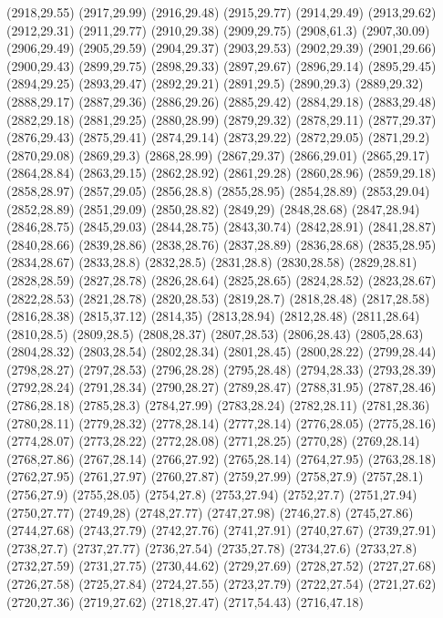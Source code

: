 (2918,29.55)
(2917,29.99)
(2916,29.48)
(2915,29.77)
(2914,29.49)
(2913,29.62)
(2912,29.31)
(2911,29.77)
(2910,29.38)
(2909,29.75)
(2908,61.3)
(2907,30.09)
(2906,29.49)
(2905,29.59)
(2904,29.37)
(2903,29.53)
(2902,29.39)
(2901,29.66)
(2900,29.43)
(2899,29.75)
(2898,29.33)
(2897,29.67)
(2896,29.14)
(2895,29.45)
(2894,29.25)
(2893,29.47)
(2892,29.21)
(2891,29.5)
(2890,29.3)
(2889,29.32)
(2888,29.17)
(2887,29.36)
(2886,29.26)
(2885,29.42)
(2884,29.18)
(2883,29.48)
(2882,29.18)
(2881,29.25)
(2880,28.99)
(2879,29.32)
(2878,29.11)
(2877,29.37)
(2876,29.43)
(2875,29.41)
(2874,29.14)
(2873,29.22)
(2872,29.05)
(2871,29.2)
(2870,29.08)
(2869,29.3)
(2868,28.99)
(2867,29.37)
(2866,29.01)
(2865,29.17)
(2864,28.84)
(2863,29.15)
(2862,28.92)
(2861,29.28)
(2860,28.96)
(2859,29.18)
(2858,28.97)
(2857,29.05)
(2856,28.8)
(2855,28.95)
(2854,28.89)
(2853,29.04)
(2852,28.89)
(2851,29.09)
(2850,28.82)
(2849,29)
(2848,28.68)
(2847,28.94)
(2846,28.75)
(2845,29.03)
(2844,28.75)
(2843,30.74)
(2842,28.91)
(2841,28.87)
(2840,28.66)
(2839,28.86)
(2838,28.76)
(2837,28.89)
(2836,28.68)
(2835,28.95)
(2834,28.67)
(2833,28.8)
(2832,28.5)
(2831,28.8)
(2830,28.58)
(2829,28.81)
(2828,28.59)
(2827,28.78)
(2826,28.64)
(2825,28.65)
(2824,28.52)
(2823,28.67)
(2822,28.53)
(2821,28.78)
(2820,28.53)
(2819,28.7)
(2818,28.48)
(2817,28.58)
(2816,28.38)
(2815,37.12)
(2814,35)
(2813,28.94)
(2812,28.48)
(2811,28.64)
(2810,28.5)
(2809,28.5)
(2808,28.37)
(2807,28.53)
(2806,28.43)
(2805,28.63)
(2804,28.32)
(2803,28.54)
(2802,28.34)
(2801,28.45)
(2800,28.22)
(2799,28.44)
(2798,28.27)
(2797,28.53)
(2796,28.28)
(2795,28.48)
(2794,28.33)
(2793,28.39)
(2792,28.24)
(2791,28.34)
(2790,28.27)
(2789,28.47)
(2788,31.95)
(2787,28.46)
(2786,28.18)
(2785,28.3)
(2784,27.99)
(2783,28.24)
(2782,28.11)
(2781,28.36)
(2780,28.11)
(2779,28.32)
(2778,28.14)
(2777,28.14)
(2776,28.05)
(2775,28.16)
(2774,28.07)
(2773,28.22)
(2772,28.08)
(2771,28.25)
(2770,28)
(2769,28.14)
(2768,27.86)
(2767,28.14)
(2766,27.92)
(2765,28.14)
(2764,27.95)
(2763,28.18)
(2762,27.95)
(2761,27.97)
(2760,27.87)
(2759,27.99)
(2758,27.9)
(2757,28.1)
(2756,27.9)
(2755,28.05)
(2754,27.8)
(2753,27.94)
(2752,27.7)
(2751,27.94)
(2750,27.77)
(2749,28)
(2748,27.77)
(2747,27.98)
(2746,27.8)
(2745,27.86)
(2744,27.68)
(2743,27.79)
(2742,27.76)
(2741,27.91)
(2740,27.67)
(2739,27.91)
(2738,27.7)
(2737,27.77)
(2736,27.54)
(2735,27.78)
(2734,27.6)
(2733,27.8)
(2732,27.59)
(2731,27.75)
(2730,44.62)
(2729,27.69)
(2728,27.52)
(2727,27.68)
(2726,27.58)
(2725,27.84)
(2724,27.55)
(2723,27.79)
(2722,27.54)
(2721,27.62)
(2720,27.36)
(2719,27.62)
(2718,27.47)
(2717,54.43)
(2716,47.18)
